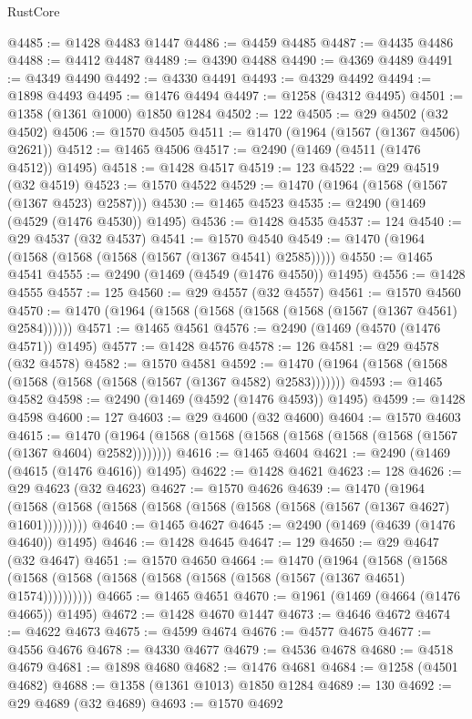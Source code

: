 \begin{lexlean}{RustCore}
\begin{coremodule}
@4485 := @1428 @4483 @1447
@4486 := @4459 @4485
@4487 := @4435 @4486
@4488 := @4412 @4487
@4489 := @4390 @4488
@4490 := @4369 @4489
@4491 := @4349 @4490
@4492 := @4330 @4491
@4493 := @4329 @4492
@4494 := @1898 @4493
@4495 := @1476 @4494
@4497 := @1258 (@4312 @4495)
@4501 := @1358 (@1361 @1000) @1850 @1284
@4502 := 122
@4505 := @29 @4502 (@32 @4502)
@4506 := @1570 @4505
@4511 := @1470 (@1964 (@1567 (@1367 @4506) @2621))
@4512 := @1465 @4506
@4517 := @2490 (@1469 (@4511 (@1476 @4512)) @1495)
@4518 := @1428 @4517
@4519 := 123
@4522 := @29 @4519 (@32 @4519)
@4523 := @1570 @4522
@4529 := @1470 (@1964 (@1568 (@1567 (@1367 @4523) @2587)))
@4530 := @1465 @4523
@4535 := @2490 (@1469 (@4529 (@1476 @4530)) @1495)
@4536 := @1428 @4535
@4537 := 124
@4540 := @29 @4537 (@32 @4537)
@4541 := @1570 @4540
@4549 := @1470 (@1964 (@1568 (@1568 (@1568 (@1567 (@1367 @4541) @2585)))))
@4550 := @1465 @4541
@4555 := @2490 (@1469 (@4549 (@1476 @4550)) @1495)
@4556 := @1428 @4555
@4557 := 125
@4560 := @29 @4557 (@32 @4557)
@4561 := @1570 @4560
@4570 := @1470 (@1964 (@1568 (@1568 (@1568 (@1568 (@1567 (@1367 @4561) @2584))))))
@4571 := @1465 @4561
@4576 := @2490 (@1469 (@4570 (@1476 @4571)) @1495)
@4577 := @1428 @4576
@4578 := 126
@4581 := @29 @4578 (@32 @4578)
@4582 := @1570 @4581
@4592 := @1470 (@1964 (@1568 (@1568 (@1568 (@1568 (@1568 (@1567 (@1367 @4582) @2583)))))))
@4593 := @1465 @4582
@4598 := @2490 (@1469 (@4592 (@1476 @4593)) @1495)
@4599 := @1428 @4598
@4600 := 127
@4603 := @29 @4600 (@32 @4600)
@4604 := @1570 @4603
@4615 := @1470 (@1964 (@1568 (@1568 (@1568 (@1568 (@1568 (@1568 (@1567 (@1367 @4604) @2582))))))))
@4616 := @1465 @4604
@4621 := @2490 (@1469 (@4615 (@1476 @4616)) @1495)
@4622 := @1428 @4621
@4623 := 128
@4626 := @29 @4623 (@32 @4623)
@4627 := @1570 @4626
@4639 := @1470
    (@1964 (@1568 (@1568 (@1568 (@1568 (@1568 (@1568 (@1568 (@1567 (@1367 @4627) @1601)))))))))
@4640 := @1465 @4627
@4645 := @2490 (@1469 (@4639 (@1476 @4640)) @1495)
@4646 := @1428 @4645
@4647 := 129
@4650 := @29 @4647 (@32 @4647)
@4651 := @1570 @4650
@4664 := @1470
    (@1964
      (@1568 (@1568 (@1568 (@1568 (@1568 (@1568 (@1568 (@1568 (@1567 (@1367 @4651) @1574))))))))))
@4665 := @1465 @4651
@4670 := @1961 (@1469 (@4664 (@1476 @4665)) @1495)
@4672 := @1428 @4670 @1447
@4673 := @4646 @4672
@4674 := @4622 @4673
@4675 := @4599 @4674
@4676 := @4577 @4675
@4677 := @4556 @4676
@4678 := @4330 @4677
@4679 := @4536 @4678
@4680 := @4518 @4679
@4681 := @1898 @4680
@4682 := @1476 @4681
@4684 := @1258 (@4501 @4682)
@4688 := @1358 (@1361 @1013) @1850 @1284
@4689 := 130
@4692 := @29 @4689 (@32 @4689)
@4693 := @1570 @4692

\end{coremodule}
\end{lexlean}
